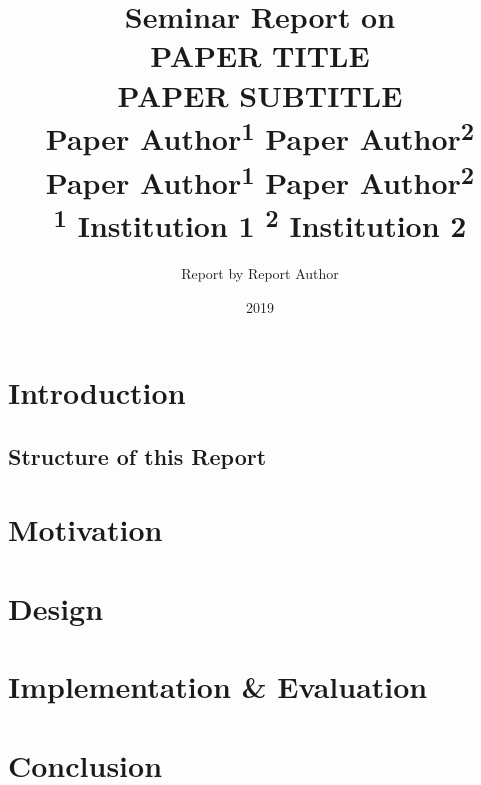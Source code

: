 \documentclass[10pt,twocolumn,letter]{article}
\begin{document}
\title{%
  {\normalfont \normalsize Seminar Report on}\\%
  PAPER TITLE \\%
  {\normalfont \normalsize PAPER SUBTITLE}\\%
  {\normalfont \small %
    Paper Author\textsuperscript{1}%
    Paper Author\textsuperscript{2}%
    Paper Author\textsuperscript{1}%
    Paper Author\textsuperscript{2}%
  }\\
  {\normalfont \small
    \textsuperscript{1} Institution 1%
    \textsuperscript{2} Institution 2%
  }%
}
\author{Report by Report Author} %
\date{2019}

\maketitle

\begin{abstract}
  \blindtext
\end{abstract}

\section{Introduction}
\blindtext

\subsection{Structure of this Report}

\section{Motivation}\label{motivation}
\section{Design}\label{design}
\section{Implementation \& Evaluation}\label{eval}
\section{Conclusion}\label{conclusion}

\nocite{*}
\clearpage
\printbibliography
\end{document}
